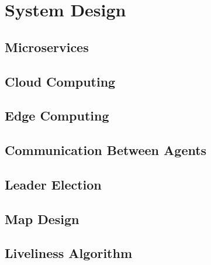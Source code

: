 \chapter{System Design}

\section{Microservices}


\section{Cloud Computing}


\section{Edge Computing}


\section{Communication Between Agents}


\section{Leader Election}


\section{Map Design}


\section{Liveliness Algorithm}
